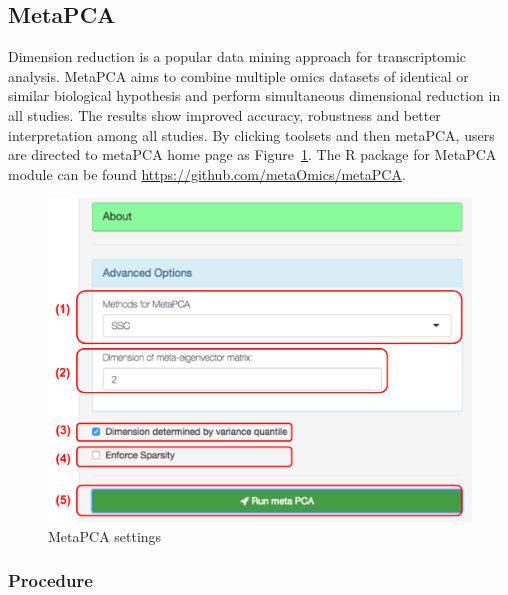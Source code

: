 \subsection{MetaPCA}
Dimension reduction is a popular data mining approach for transcriptomic analysis.
MetaPCA aims to combine multiple omics datasets of identical or similar biological hypothesis and perform simultaneous dimensional reduction in all studies.
The results show improved accuracy, robustness and better interpretation among all studies.
By clicking toolsets and then metaPCA,
users are directed to metaPCA home page as Figure~\ref{fig:metaPCAHome}.
The R package for MetaPCA module can be found \url{https://github.com/metaOmics/metaPCA}.

\begin{figure}[H]
\begin{center}
\includegraphics[scale=0.4]{./figure/metaPCA/metaPCAHome.pdf}
\caption{MetaPCA settings}
\label{fig:metaPCAHome}
\end{center}
\end{figure}

\subsubsection{Procedure}

